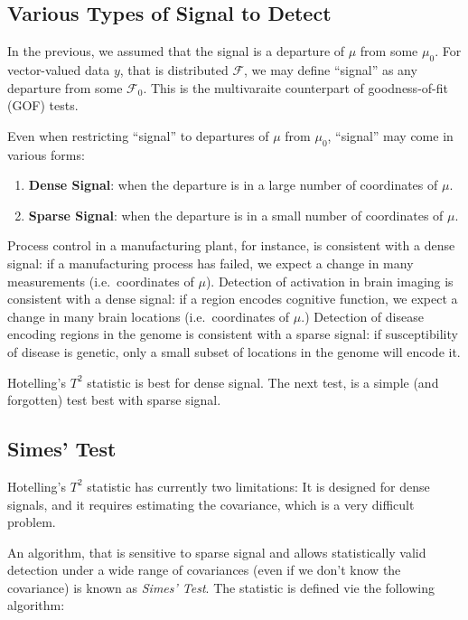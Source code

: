 \documentclass[]{book}
\providecommand{\tightlist}{%
  \setlength{\itemsep}{0pt}\setlength{\parskip}{0pt}}
\theoremstyle{definition}
\theoremstyle{definition}
\theoremstyle{definition}
\theoremstyle{remark}
\begin{document}
\hypertarget{various-types-of-signal-to-detect}{%
\subsection{Various Types of Signal to Detect}\label{various-types-of-signal-to-detect}}

In the previous, we assumed that the signal is a departure of \(\mu\) from some \(\mu_0\).
For vector-valued data \(y\), that is distributed \(\mathcal F\), we may define ``signal'' as any departure from some \(\mathcal F_0\).
This is the multivaraite counterpart of goodness-of-fit (GOF) tests.

Even when restricting ``signal'' to departures of \(\mu\) from \(\mu_0\), ``signal'' may come in various forms:

\begin{enumerate}
\def\labelenumi{\arabic{enumi}.}
\tightlist
\item
  \textbf{Dense Signal}: when the departure is in a large number of coordinates of \(\mu\).
\item
  \textbf{Sparse Signal}: when the departure is in a small number of coordinates of \(\mu\).
\end{enumerate}

Process control in a manufacturing plant, for instance, is consistent with a dense signal: if a manufacturing process has failed, we expect a change in many measurements (i.e.~coordinates of \(\mu\)).
Detection of activation in brain imaging is consistent with a dense signal: if a region encodes cognitive function, we expect a change in many brain locations (i.e.~coordinates of \(\mu\).)
Detection of disease encoding regions in the genome is consistent with a sparse signal: if susceptibility of disease is genetic, only a small subset of locations in the genome will encode it.

Hotelling's \(T^2\) statistic is best for dense signal.
The next test, is a simple (and forgotten) test best with sparse signal.

\hypertarget{simes-test}{%
\subsection{Simes' Test}\label{simes-test}}

Hotelling's \(T^2\) statistic has currently two limitations: It is designed for dense signals, and it requires estimating the covariance, which is a very difficult problem.

An algorithm, that is sensitive to sparse signal and allows statistically valid detection under a wide range of covariances (even if we don't know the covariance) is known as \emph{Simes' Test}.
The statistic is defined vie the following algorithm:
\end{document}
